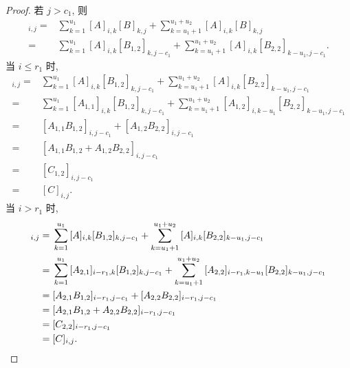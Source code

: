\begin{proof}
    若 \(j > c_1\), 则
    \begin{align*}
        [AB]_{i,j}
        = {} &
        \sum_{k=1}^{u_1}
        {[A]_{i,k} [B]_{k,j}}
        +
        \sum_{k=u_1+1}^{u_1+u_2}
        {[A]_{i,k} [B]_{k,j}}
        \\
        = {} &
        \sum_{k=1}^{u_1}
        {[A]_{i,k} [B_{1,2}]_{k,j-c_1}}
        +
        \sum_{k=u_1+1}^{u_1+u_2}
        {[A]_{i,k} [B_{2,2}]_{k-u_1,j-c_1}}.
    \end{align*}
    当 \(i \leq r_1\) 时,
    \begin{align*}
        [AB]_{i,j}
        = {} &
        \sum_{k=1}^{u_1}
        {[A]_{i,k} [B_{1,2}]_{k,j-c_1}}
        +
        \sum_{k=u_1+1}^{u_1+u_2}
        {[A]_{i,k} [B_{2,2}]_{k-u_1,j-c_1}}
        \\
        = {} &
        \sum_{k=1}^{u_1}
        {[A_{1,1}]_{i,k} [B_{1,2}]_{k,j-c_1}}
        +
        \sum_{k=u_1+1}^{u_1+u_2}
        {[A_{1,2}]_{i,k-u_1} [B_{2,2}]_{k-u_1,j-c_1}}
        \\
        = {} &
        [A_{1,1} B_{1,2}]_{i,j-c_1}
        + [A_{1,2} B_{2,2}]_{i,j-c_1}
        \\
        = {} &
        [A_{1,1} B_{1,2} + A_{1,2} B_{2,2}]_{i,j-c_1}
        \\
        = {} &
        [C_{1,2}]_{i,j-c_1}
        \\
        = {} &
        [C]_{i,j}.
    \end{align*}
    当 \(i > r_1\) 时,
    \begin{align*}
        [AB]_{i,j}
        = {} &
        \sum_{k=1}^{u_1}
        {[A]_{i,k} [B_{1,2}]_{k,j-c_1}}
        +
        \sum_{k=u_1+1}^{u_1+u_2}
        {[A]_{i,k} [B_{2,2}]_{k-u_1,j-c_1}}
        \\
        = {} &
        \sum_{k=1}^{u_1}
        {[A_{2,1}]_{i-r_1,k} [B_{1,2}]_{k,j-c_1}}
        +
        \sum_{k=u_1+1}^{u_1+u_2}
        {[A_{2,2}]_{i-r_1,k-u_1} [B_{2,2}]_{k-u_1,j-c_1}}
        \\
        = {} &
        [A_{2,1} B_{1,2}]_{i-r_1,j-c_1}
        + [A_{2,2} B_{2,2}]_{i-r_1,j-c_1}
        \\
        = {} &
        [A_{2,1} B_{1,2} + A_{2,2} B_{2,2}]_{i-r_1,j-c_1}
        \\
        = {} &
        [C_{2,2}]_{i-r_1,j-c_1}
        \\
        = {} &
        [C]_{i,j}.
        \qedhere
    \end{align*}
\end{proof}
